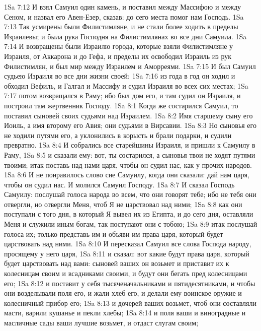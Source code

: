 \vs 1Sa 7:12 И взял Самуил один камень, и поставил между Массифою и между Сеном, и назвал его Авен-Езер, сказав: до сего места помог нам Господь.
\vs 1Sa 7:13 Так усмирены были Филистимляне, и не стали более ходить в пределы Израилевы; и была рука Господня на Филистимлянах во все дни Самуила.
\vs 1Sa 7:14 И возвращены были Израилю города, которые взяли Филистимляне у Израиля, от Аккарона и до Гефа, и пределы их освободил Израиль из рук Филистимлян, и был мир между Израилем и Аморреями.
\rsbpar\vs 1Sa 7:15 И был Самуил судьею Израиля во все дни жизни своей:
\vs 1Sa 7:16 из года в год он ходил и обходил Вефиль, и Галгал и Массифу и судил Израиля во всех сих местах;
\vs 1Sa 7:17 потом возвращался в Раму; ибо  был дом его, и там судил он Израиля, и построил там жертвенник Господу.
\vs 1Sa 8:1 Когда же состарился Самуил, то поставил сыновей своих судьями над Израилем.
\vs 1Sa 8:2 Имя старшему сыну его Иоиль, а имя второму  его Авия; они  судьями в Вирсавии.
\vs 1Sa 8:3 Но сыновья его не ходили путями его, а уклонились в корысть и брали подарки, и судили превратно.
\vs 1Sa 8:4 И собрались все старейшины Израиля, и пришли к Самуилу в Раму,
\vs 1Sa 8:5 и сказали ему: вот, ты состарился, а сыновья твои не ходят путями твоими; итак поставь над нами царя, чтобы он судил нас, как у прочих народов.
\vs 1Sa 8:6 И не понравилось слово сие Самуилу, когда они сказали: дай нам царя, чтобы он судил нас. И молился Самуил Господу.
\rsbpar\vs 1Sa 8:7 И сказал Господь Самуилу: послушай голоса народа во всем, что они говорят тебе; ибо не тебя они отвергли, но отвергли Меня, чтоб Я не царствовал над ними;
\vs 1Sa 8:8 как они поступали с того дня, в который Я вывел их из Египта, и до сего дня, оставляли Меня и служили иным богам, так поступают они с тобою;
\vs 1Sa 8:9 итак послушай голоса их; только представь им и объяви им права царя, который будет царствовать над ними.
\vs 1Sa 8:10 И пересказал Самуил все слова Господа народу, просящему у него царя,
\vs 1Sa 8:11 и сказал: вот какие будут права царя, который будет царствовать над вами: сыновей ваших он возьмет и приставит их к колесницам своим и  всадниками своими, и будут они бегать пред колесницами его;
\vs 1Sa 8:12 и поставит  у себя тысяченачальниками и пятидесятниками, и чтобы они возделывали поля его, и жали хлеб его, и делали ему воинское оружие и колесничный прибор его;
\vs 1Sa 8:13 и дочерей ваших возьмет, чтоб они составляли масти, варили кушанье и пекли хлебы;
\vs 1Sa 8:14 и поля ваши и виноградные и масличные сады ваши лучшие возьмет, и отдаст слугам своим;

